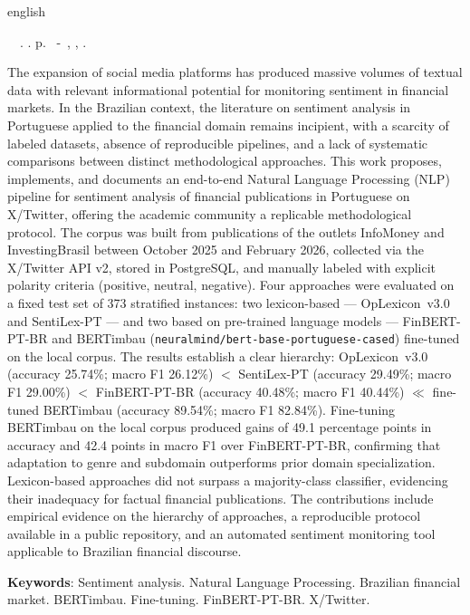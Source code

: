 \begin{resumo}[Abstract]
	\begin{otherlanguage*}{english}
		\begin{flushleft} 
			\setlength{\absparsep}{0pt} %
			\SingleSpacing  		\imprimirautorabr~~\textbf{\imprimirtitleabstract}.	\imprimirdata.  \pageref{LastPage} p. 
			\imprimirtipotrabalhoabs~-~\imprimirinstituicao, \imprimirlocal, 	\imprimirdata. 
		\end{flushleft}
		\OnehalfSpacing 
		
		The expansion of social media platforms has produced massive volumes of textual data with relevant informational potential for monitoring sentiment in financial markets. In the Brazilian context, the literature on sentiment analysis in Portuguese applied to the financial domain remains incipient, with a scarcity of labeled datasets, absence of reproducible pipelines, and a lack of systematic comparisons between distinct methodological approaches. This work proposes, implements, and documents an end-to-end Natural Language Processing (NLP) pipeline for sentiment analysis of financial publications in Portuguese on X/Twitter, offering the academic community a replicable methodological protocol. The corpus was built from publications of the outlets InfoMoney and InvestingBrasil between October 2025 and February 2026, collected via the X/Twitter API v2, stored in PostgreSQL, and manually labeled with explicit polarity criteria (positive, neutral, negative). Four approaches were evaluated on a fixed test set of 373 stratified instances: two lexicon-based --- OpLexicon~v3.0 and SentiLex-PT --- and two based on pre-trained language models --- FinBERT-PT-BR and BERTimbau (\texttt{neuralmind/bert-base-portuguese-cased}) fine-tuned on the local corpus. The results establish a clear hierarchy: OpLexicon~v3.0 (accuracy 25.74\%; macro F1 26.12\%) $<$ SentiLex-PT (accuracy 29.49\%; macro F1 29.00\%) $<$ FinBERT-PT-BR (accuracy 40.48\%; macro F1 40.44\%) $\ll$ fine-tuned BERTimbau (accuracy 89.54\%; macro F1 82.84\%). Fine-tuning BERTimbau on the local corpus produced gains of 49.1 percentage points in accuracy and 42.4 points in macro F1 over FinBERT-PT-BR, confirming that adaptation to genre and subdomain outperforms prior domain specialization. Lexicon-based approaches did not surpass a majority-class classifier, evidencing their inadequacy for factual financial publications. The contributions include empirical evidence on the hierarchy of approaches, a reproducible protocol available in a public repository, and an automated sentiment monitoring tool applicable to Brazilian financial discourse.
		
		
		\textbf{Keywords}: Sentiment analysis. Natural Language Processing. Brazilian financial market. BERTimbau. Fine-tuning. FinBERT-PT-BR. X/Twitter.
	\end{otherlanguage*}
\end{resumo}